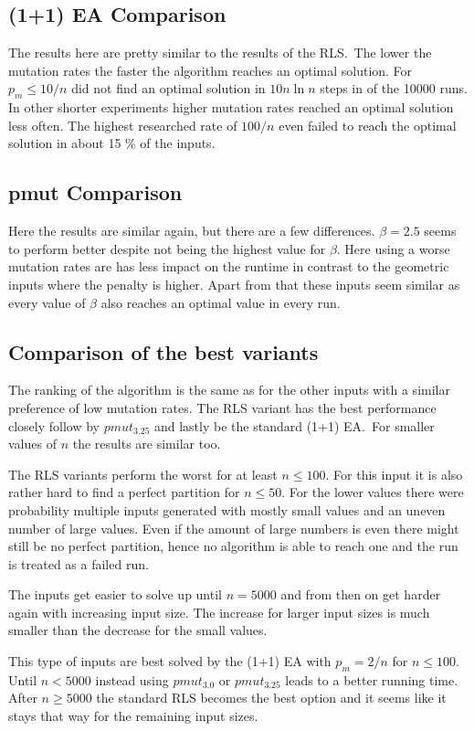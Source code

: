 \subsection{(1+1) EA Comparison}


The results here are pretty similar to the results of the RLS.\
The lower the mutation rates the faster the algorithm reaches an optimal solution.
For $p_m\le10/n$ did not find an optimal solution in $10n\ln n$ steps in of the 10000 runs.
In other shorter experiments higher mutation rates reached an optimal solution less often.
The highest researched rate of $100/n$ even failed to reach the optimal solution in about 15 \% of the inputs.

\subsection{pmut Comparison}


Here the results are similar again, but there are a few differences.
$\beta=2.5$ seems to perform better despite not being the highest value for $\beta$.
Here using a worse mutation rates are has less impact on the runtime in contrast to the geometric inputs where the penalty is higher.
Apart from that these inputs seem similar as every value of $\beta$ also reaches an optimal value in every run.

\subsection{Comparison of the best variants}
The ranking of the algorithm is the same as for the other inputs with a similar preference of low mutation rates.
The RLS variant has the best performance closely follow by $pmut_{3.25}$ and lastly be the standard (1+1) EA.\
For smaller values of $n$ the results are similar too.



The RLS variants perform the worst for at least $n\le 100$.
For this input it is also rather hard to find a perfect partition for $n\le50$.
For the lower values there were probability multiple inputs generated with mostly small values and an uneven number of large values.
Even if the amount of large numbers is even there might still be no perfect partition, hence no algorithm is able to reach one and the run is treated as a failed run.



The inputs get easier to solve up until $n=5000$ and from then on get harder again with increasing input size.
The increase for larger input sizes is much smaller than the decrease for the small values.



This type of inputs are best solved by the (1+1) EA with $p_m=2/n$ for $n\le100$.
Until $n<5000$ instead using $pmut_{3.0}$ or $pmut_{3.25}$ leads to a better running time.
After $n\ge5000$ the standard RLS becomes the best option and it seems like it stays that way for the remaining input sizes.
